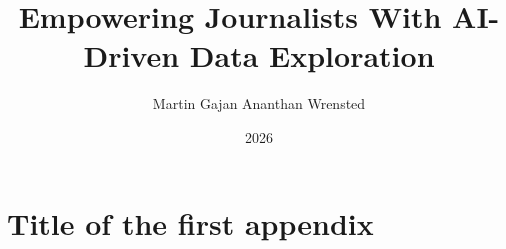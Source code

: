 \documentclass[b5paper,12pt]{book} %
\author{Martin Gajan Ananthan Wrensted}
\title{Empowering Journalists With AI-Driven Data Exploration}
\date{2026}
\begin{document}
\frontmatter





\tableofcontents

\mainmatter







% 









\appendix
\renewcommand{\chaptermark}[1]{\markboth{\small Appendix \thechapter. #1}{}}

\chapter{Title of the first appendix} \label{app:freq}

\backmatter

\end{document}
